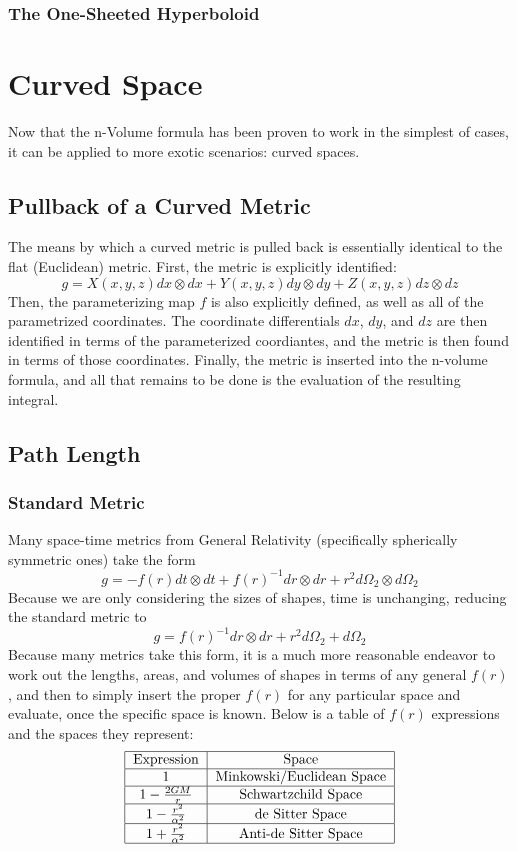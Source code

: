 \documentclass{article}
\begin{document}
\subsubsection{The One-Sheeted Hyperboloid}


\newpage

\section{Curved Space}
Now that the n-Volume formula has been proven to work in the simplest of cases, it can be applied to more exotic scenarios: curved spaces.

\subsection{Pullback of a Curved Metric}
The means by which a curved metric is pulled back is essentially identical to the flat (Euclidean) metric. First, the metric is explicitly identified:
\[
g = X(x,y,z) dx \otimes dx + Y(x,y,z) dy \otimes dy + Z(x,y,z) dz \otimes dz
\]
Then, the parameterizing map $f$ is also explicitly defined, as well as all of the parametrized coordinates. The coordinate differentials $dx$, $dy$, and $dz$ are then identified in terms of the parameterized coordiantes, and the metric is then found in terms of those coordinates. Finally, the metric is inserted into the n-volume formula, and all that remains to be done is the evaluation of the resulting integral.

\newpage
\subsection{Path Length}
\subsubsection{Standard Metric}
Many space-time metrics from General Relativity (specifically spherically symmetric ones) take the form
\[
g = -f(r) dt \otimes dt + f(r)^{-1} dr \otimes dr + r^2 d\Omega_2 \otimes d\Omega_2
\]
Because we are only considering the sizes of shapes, time is unchanging, reducing the standard metric to
\[
g = f(r)^{-1} dr \otimes dr + r^2 d\Omega_2 + d\Omega_2
\]
Because many metrics take this form, it is a much more reasonable endeavor to work out the lengths, areas, and volumes of shapes in terms of any general $f(r)$, and then to simply insert the proper $f(r)$ for any particular space and evaluate, once the specific space is known. Below is a table of $f(r)$ expressions and the spaces they represent:
\[
\begin{tabular}{|c|c|}
\hline
    Expression & Space \\ \hline
    $1$ & Minkowski/Euclidean Space \\ \hline
    $1 - \frac{2GM}{r}$ & Schwartzchild Space \\ \hline
    $1 - \frac{r^2}{\alpha^2}$ & de Sitter Space \\ \hline
    $1 + \frac{r^2}{\alpha^2}$ & Anti-de Sitter Space \\ \hline
\end{tabular}
\]
\end{document}
